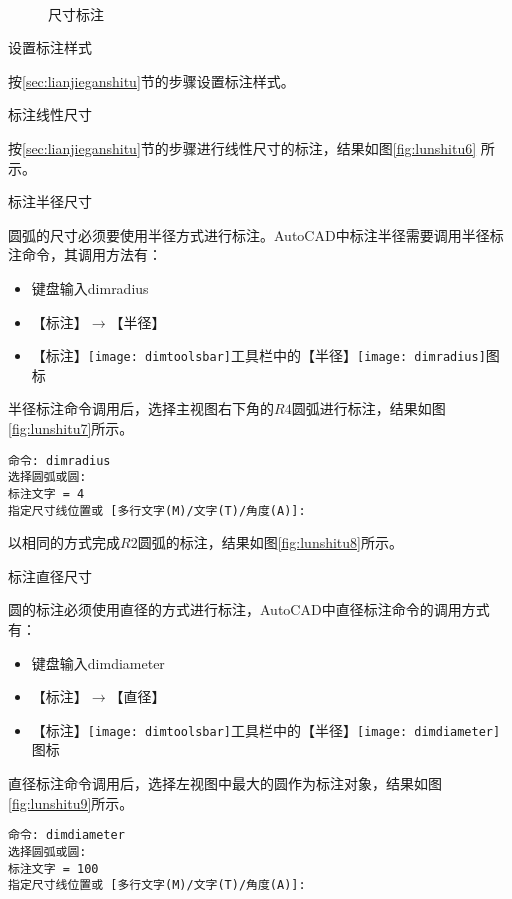 \begin{figure}[htbp]
\centering
{}\hspace{20pt}
\\
\hspace{20pt}
\caption{尺寸标注}

\end{figure}
\begin{procedure}
\item 设置标注样式

按\ref{sec:lianjieganshitu}节的步骤设置标注样式。

\item 标注线性尺寸

按\ref{sec:lianjieganshitu}节的步骤进行线性尺寸的标注，结果如图\ref{fig:lunshitu6} 所示。


\item 标注半径尺寸

圆弧的尺寸必须要使用半径方式进行标注。AutoCAD中标注半径需要调用半径标注命令，其调用方法有：
\begin{itemize}
\item 键盘输入dimradius
\item 【标注】$\rightarrow $【半径】
\item 【标注】\texttt{[image: dimtoolsbar]}工具栏中的【半径】\texttt{[image: dimradius]}图标
\end{itemize}

半径标注命令调用后，选择主视图右下角的$R4$圆弧进行标注，结果如图\ref{fig:lunshitu7}所示。
\begin{lstlisting}
命令: dimradius
选择圆弧或圆:
标注文字 = 4
指定尺寸线位置或 [多行文字(M)/文字(T)/角度(A)]:
\end{lstlisting}

以相同的方式完成$R2$圆弧的标注，结果如图\ref{fig:lunshitu8}所示。
\item 标注直径尺寸

圆的标注必须使用直径的方式进行标注，AutoCAD中直径标注命令的调用方式有：
\begin{itemize}
\item 键盘输入dimdiameter
\item 【标注】$\rightarrow $【直径】
\item 【标注】\texttt{[image: dimtoolsbar]}工具栏中的【半径】\texttt{[image: dimdiameter]}图标
\end{itemize}

直径标注命令调用后，选择左视图中最大的圆作为标注对象，结果如图\ref{fig:lunshitu9}所示。

\begin{lstlisting}
命令: dimdiameter
选择圆弧或圆:
标注文字 = 100
指定尺寸线位置或 [多行文字(M)/文字(T)/角度(A)]:
\end{lstlisting}
\end{procedure}
\endinput